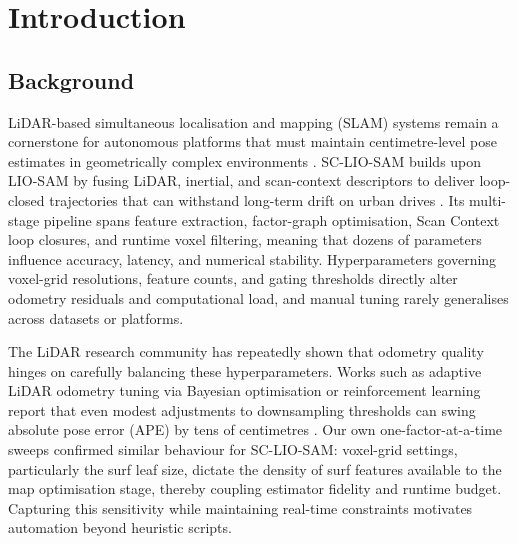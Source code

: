 \chapter[Introduction]{Introduction}
\label{Chap:Intro}

\makeatletter
\setlength{\@fptop}{0pt} %
\makeatother



\section{Background}
LiDAR-based simultaneous localisation and mapping (SLAM) systems remain a cornerstone for autonomous platforms that must maintain centimetre-level pose estimates in geometrically complex environments \cite{cadena_2016_past}. SC-LIO-SAM builds upon LIO-SAM by fusing LiDAR, inertial, and scan-context descriptors to deliver loop-closed trajectories that can withstand long-term drift on urban drives \cite{shan_2020_liosam}. Its multi-stage pipeline spans feature extraction, factor-graph optimisation, Scan Context loop closures, and runtime voxel filtering, meaning that dozens of parameters influence accuracy, latency, and numerical stability. Hyperparameters governing voxel-grid resolutions, feature counts, and gating thresholds directly alter odometry residuals and computational load, and manual tuning rarely generalises across datasets or platforms.

The LiDAR research community has repeatedly shown that odometry quality hinges on carefully balancing these hyperparameters. Works such as adaptive LiDAR odometry tuning via Bayesian optimisation or reinforcement learning report that even modest adjustments to downsampling thresholds can swing absolute pose error (APE) by tens of centimetres \cite{koide_2021_adaptive,goudreault_2023_lidarintheloop}. Our own one-factor-at-a-time sweeps confirmed similar behaviour for SC-LIO-SAM: voxel-grid settings, particularly the surf leaf size, dictate the density of surf features available to the map optimisation stage, thereby coupling estimator fidelity and runtime budget. Capturing this sensitivity while maintaining real-time constraints motivates automation beyond heuristic scripts.

